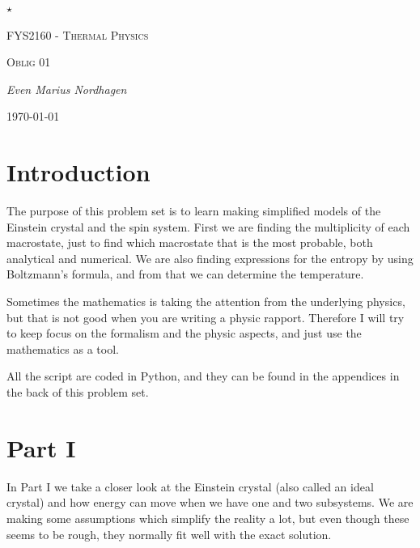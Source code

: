 \documentclass{scrartcl}
\begin{document}
\begin{titlepage}
	\centering
	{\scshape\LARGE $\star$  \par}
	\vspace{4cm}
	{\scshape\huge FYS2160 - Thermal Physics  \par}
	\vspace{1cm}
	{\scshape\Large Oblig 01\par}
	\vspace{2cm}
	{\Large\itshape Even Marius Nordhagen\par}
	\vfill
	{\large \today\par}
\end{titlepage}
\section{Introduction}
The purpose of this problem set is to learn making simplified models of the Einstein crystal and the spin system. First we are finding the multiplicity of each macrostate, just to find which macrostate that is the most probable, both analytical and numerical. We are also finding expressions for the entropy by using Boltzmann's formula, and from that we can determine the temperature.\par\vspace{3mm}
Sometimes the mathematics is taking the attention from the underlying physics, but that is not good when you are writing a physic rapport. Therefore I will try to keep focus on the formalism and the physic aspects, and just use the mathematics as a tool.\par\vspace{3mm}
All the script are coded in Python, and they can be found in the appendices in the back of this problem set.
\newpage

\section{Part I}
In Part I we take a closer look at the Einstein crystal (also called an ideal crystal) and how energy can move when we have one and two subsystems. We are making some assumptions which simplify the reality a lot, but even though these seems to be rough, they normally fit well with the exact solution.  
\end{document}
